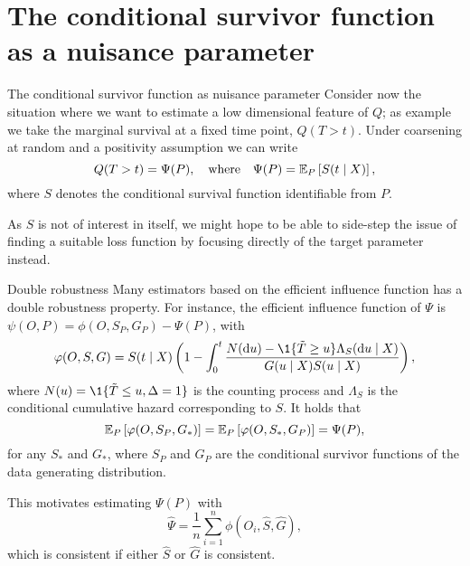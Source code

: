 \documentclass[smaller]{beamer}\usepackage{listings}
\begin{document}
\section{The conditional survivor function as a nuisance parameter}
\label{sec:org6350022}
\begin{frame}[label={sec:org4194fdb}]{The conditional survivor function as nuisance parameter}
Consider now the situation where we want to estimate a low dimensional feature of \(Q\); as example
we take the marginal survival at a fixed time point, \(Q(T > t)\). Under coarsening at random and a
positivity assumption we can write
\begin{equation*}
  Q(T > t) = \Psi(P),
  \quad \text{where} \quad
  \Psi(P) = \operatorname{\mathbb{E}}_P\left[ S(t \mid X) \right],
\end{equation*}
where \(S\) denotes the conditional survival function identifiable from \(P\). 

\vfill

As \(S\) is not of interest in itself, we might hope to be able to side-step the issue of finding a
suitable loss function by focusing directly of the target parameter instead. 
\end{frame}

\begin{frame}[label={sec:org3b28e4b}]{Double robustness}
\small Many estimators based on the efficient influence function has a double robustness property.
For instance, the efficient influence function of \(\Psi\) is \(\psi(O, P) = \phi(O, S_P, G_P) -
\Psi(P)\), with
\begin{equation*}
  \phi(O, S, G) = S(t \mid X)
  \left(
    1- \int_0^t \frac{N(\diff u) - \1{\{\tilde T \geq u\}} \Lambda_S(\diff u \mid X)}{G(u \mid X) S(u \mid X)}   
  \right),
\end{equation*}
where \(N(u) = \1{\{\tilde T \leq u, \Delta=1\}}\) is the counting process and $\Lambda_S$ is the
conditional cumulative hazard corresponding to \(S\). It holds that
\begin{equation*}
  \operatorname{\mathbb{E}}_P{\left[ \varphi(O, S_P, G_*) \right]}
  = \operatorname{\mathbb{E}}_P{\left[ \varphi(O, S_*, G_P) \right]}
  = \Psi(P),
\end{equation*}
for any \(S_*\) and \(G_*\), where \(S_P\) and \(G_P\) are the conditional survivor functions of the
data generating distribution.

\vfill

This motivates estimating $\Psi(P)$ with
\begin{equation*}
  \hat \Psi = \frac{1}{n}\sum_{i=1}^{n}\phi(O_i, \hat S, \hat G),
\end{equation*}
which is consistent if either \(\hat S\) or \(\hat G\) is consistent.
\end{frame}
\end{document}
